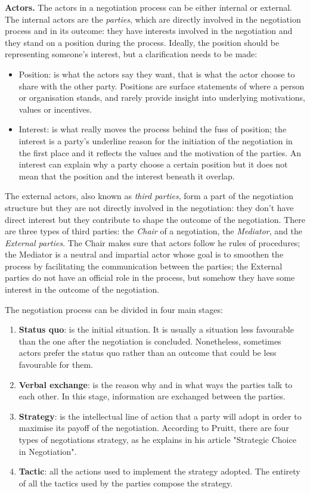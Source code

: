\documentclass[../main.tex]{subfiles}
\begin{document}
\textbf{Actors.} The actors in a negotiation process can be either internal or external. The internal actors are the \textit{parties}, which are directly involved in the negotiation process and in its outcome: they have interests involved in the negotiation and they stand on a position during the process. Ideally, the position should be representing someone's interest, but a clarification needs to be made:
\begin{itemize}
\item Position: is what the actors say they want, that is what the actor choose to share with the other party. Positions are surface statements of where a person or organisation stands, and rarely provide insight into underlying motivations, values or incentives\autocite[]{watershed}.
\item Interest: is what really moves the process behind the fuss of position; the interest is a party's underline reason for the initiation of the negotiation in the first place and it reflects the values and the motivation of the parties. An interest can explain why a party choose a certain position but it does not mean that the position and the interest beneath it overlap.
\end{itemize}
The external actors, also known as \textit{third parties}, form a part of the negotiation structure but they are not directly involved in the negotiation: they don't have direct interest but they contribute to shape the outcome of the negotiation. There are three types of third parties: the \textit{Chair} of a negotiation, the \textit{Mediator}, and the \textit{External parties}. The Chair makes sure that actors follow he rules of procedures; the Mediator is a neutral and impartial actor whose goal is to smoothen the process by facilitating the communication between the parties; the External parties do not have an official role in the process, but somehow they have some interest in the outcome of the negotiation.

The negotiation process can be divided in four main stages:
\begin{enumerate}
\item \textbf{Status quo}: is the initial situation. It is usually a situation less favourable than the one after the negotiation is concluded. Nonetheless, sometimes actors prefer the status quo rather than an outcome that could be less favourable for them.
\item \textbf{Verbal exchange}: is the reason why and in what ways the parties talk to each other. In this stage, information are exchanged between the parties.
\item \textbf{Strategy}: is the intellectual line of action that a party will adopt in order to maximise its payoff of the negotiation. According to Pruitt, there are four types of negotiations strategy, as he explains in his article "Strategic Choice in Negotiation"\autocite[167]{pruitt}.
\item \textbf{Tactic}: all the actions used to implement the strategy adopted. The entirety of all the tactics used by the parties compose the strategy.
\end{enumerate}
\end{document}
